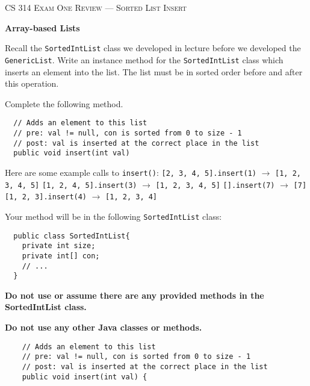 \documentclass[12pt,letter]{article}
\begin{document}
\noindent\textsc{\large CS 314 Exam One Review --- Sorted List Insert}

\vspace{6pt}
\noindent\textbf{Array-based Lists}

\vspace{2pt}
\noindent Recall the \texttt{SortedIntList} class we developed in lecture before we developed
the \texttt{GenericList}. Write an instance method for the \texttt{SortedIntList} class which inserts
an element into the list. The list must be in sorted order before and after this operation.

\vspace{4pt}
\noindent Complete the following method.
\begin{verbatim}
  // Adds an element to this list
  // pre: val != null, con is sorted from 0 to size - 1
  // post: val is inserted at the correct place in the list
  public void insert(int val)
\end{verbatim}

\vspace{4pt}

\noindent Here are some example calls to \texttt{insert()}:
\newline
\noindent \texttt{[2, 3, 4, 5].insert(1)} $\rightarrow$ \texttt{[1, 2, 3, 4, 5]}
\newline
\noindent \texttt{[1, 2, 4, 5].insert(3)} $\rightarrow$ \texttt{[1, 2, 3, 4, 5]}
\newline
\noindent \texttt{[].insert(7)} $\rightarrow$ \texttt{[7]}
\newline
\noindent \texttt{[1, 2, 3].insert(4)} $\rightarrow$ \texttt{[1, 2, 3, 4]}
\newline

\noindent Your method will be in the following \texttt{SortedIntList} class:

\begin{verbatim}
  public class SortedIntList{
    private int size;
    private int[] con;
    // ...
  }

\end{verbatim}

\noindent \textbf{Do not use or assume there are any provided methods in the SortedIntList class.}

\noindent \textbf{Do not use any other Java classes or methods.}

\clearpage
\begin{verbatim}
    // Adds an element to this list
    // pre: val != null, con is sorted from 0 to size - 1
    // post: val is inserted at the correct place in the list
    public void insert(int val) {
\end{verbatim}
\end{document}
